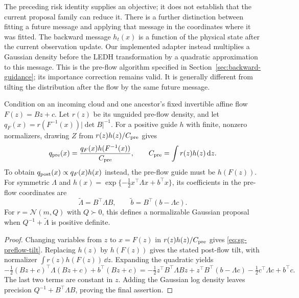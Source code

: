 The preceding risk identity supplies an objective; it does not establish that
the current proposal family can reduce it. There is a further distinction
between fitting a future message and applying that message in the coordinates
where it was fitted. The backward message $h_t(x)$ is a function of the
physical state after the current observation update. Our implemented adapter
instead multiplies a Gaussian density before the LEDH transformation by a
quadratic approximation to this message. This is the pre-flow algorithm
specified in Section~\ref{sec:backward-guidance}; its importance correction
remains valid. It is generally different from tilting the distribution after
the flow by the same future message.

\begin{proposition}
\label{prop:sg-guide-coordinates}
Condition on an incoming cloud and one ancestor's fixed invertible affine
flow $F(z)=Bz+c$. Let $r(z)$ be its unguided pre-flow density, and let
$q_F(x)=r(F^{-1}(x))|\det B|^{-1}$. For a positive guide $h$ with finite,
nonzero normalizers, drawing $Z$ from $r(z)h(z)/C_{\rm pre}$ gives
\begin{equation}
 q_{\rm pre}(x)
 =\frac{q_F(x)h(F^{-1}(x))}{C_{\rm pre}},
 \qquad C_{\rm pre}=\int r(z)h(z)\,\mathrm{d} z.
 \label{eq:sg-preflow-tilt}
\end{equation}
To obtain $q_{\rm post}(x)\propto q_F(x)h(x)$ instead, the pre-flow guide
must be $h(F(z))$. For symmetric $\Lambda$ and
$h(x)=\exp\{-\tfrac12x^\top\Lambda x+b^\top x\}$, its coefficients
in the pre-flow coordinates are
\begin{equation}
 \widetilde\Lambda=B^\top\Lambda B,
 \qquad \widetilde b=B^\top(b-\Lambda c).
 \label{eq:sg-pulled-guide}
\end{equation}
For $r=\mathcal N(m,Q)$ with $Q\succ0$, this defines a normalizable Gaussian proposal
when $Q^{-1}+\widetilde\Lambda$ is positive definite.
\end{proposition}
\begin{proof}
Changing variables from $z$ to $x=F(z)$ in $r(z)h(z)/C_{\rm pre}$ gives
\eqref{eq:sg-preflow-tilt}. Replacing $h(z)$ by $h(F(z))$ gives the
stated post-flow tilt, with normalizer $\int r(z)h(F(z))\,\dd z$.
Expanding the quadratic yields
\[
 -\tfrac12(Bz+c)^\top\Lambda(Bz+c)+b^\top(Bz+c)
 =-\tfrac12z^\top B^\top\Lambda Bz
   +z^\top B^\top(b-\Lambda c)
   -\tfrac12c^\top\Lambda c+b^\top c.
\]
The last two terms are constant in $z$. Adding the Gaussian log density
leaves precision $Q^{-1}+B^\top\Lambda B$, proving the final assertion.
\end{proof}

